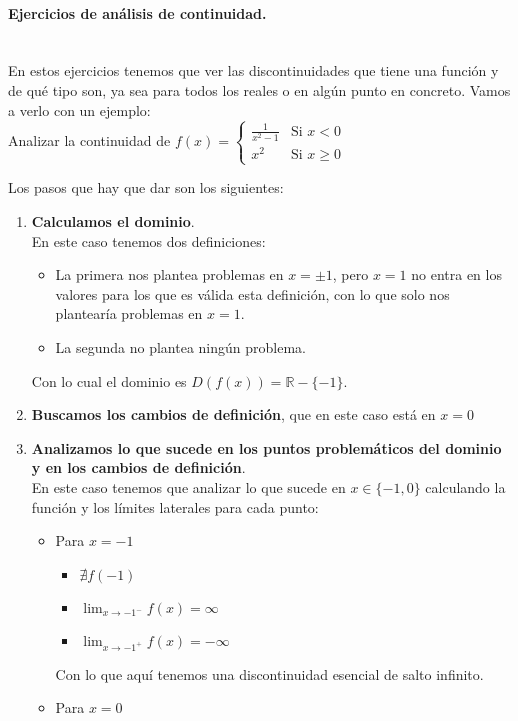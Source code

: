 \documentclass[a4paper,11pt,answers]{exam}
\begin{document}
\paragraph{Ejercicios de análisis de continuidad.}\mbox{}\\
En estos ejercicios tenemos que ver las discontinuidades que tiene una función y de qué tipo son, ya sea para todos los reales o en algún punto en concreto. Vamos a verlo con un ejemplo:\\
Analizar la continuidad de $f(x) = \left\lbrace \begin{array}{ll}
\frac{1}{x^2 - 1}&\text{Si } x < 0\\
x^2 &\text{Si } x \geq 0
\end{array}\right.$
\begin{solution}
Los pasos que hay que dar son los siguientes:
\begin{enumerate}
	\item \textbf{Calculamos el dominio}.\\
	En este caso tenemos dos definiciones:
	\begin{itemize}
		\item  La primera nos plantea problemas en $x=\pm 1$, pero $x=1$ no entra en los valores para los que es válida esta definición, con lo que solo nos plantearía problemas en $x=1$.
		\item La segunda no plantea ningún problema.
	\end{itemize}
	Con lo cual el dominio es $D(f(x)) = \mathbb{R}- \{-1\}$.
	\item \textbf{Buscamos los cambios de definición}, que en este caso está en $x=0$
	\item \textbf{Analizamos lo que sucede en los puntos problemáticos del dominio y en los cambios de definición}.\\
	En este caso tenemos que analizar lo que sucede en $x \in \{-1, 0\}$ calculando la función y los límites laterales para cada punto:
	\begin{itemize}
		\item Para $x= -1$
		\begin{itemize}
			\item $\nexists f(-1)$
			\item $\lim_{x \to -1^-} f(x) = \infty$
			\item $\lim_{x \to -1^+} f(x) = -\infty$
		\end{itemize}
		Con lo que aquí tenemos una discontinuidad esencial de salto infinito.
		\item Para $x=0$

\end{itemize}
\end{enumerate}
\end{solution}
\end{document}
